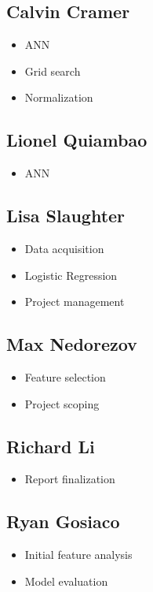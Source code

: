\documentclass[letterpaper, 12 pt, conference]{ieeeconf}  %
\begin{document}
\subsection*{Calvin Cramer}
        \begin{itemize}
                \item ANN
                \item Grid search
                \item Normalization
        \end{itemize}

\subsection*{Lionel Quiambao}
        \begin{itemize}
                \item ANN
        \end{itemize}

\subsection*{Lisa Slaughter}
        \begin{itemize}
                \item Data acquisition
                \item Logistic Regression
                \item Project management
        \end{itemize}

\subsection*{Max Nedorezov}
        \begin{itemize}
                \item Feature selection
                \item Project scoping
        \end{itemize}

\subsection*{Richard Li}
        \begin{itemize}
                \item Report finalization
        \end{itemize}

\subsection*{Ryan Gosiaco}
        \begin{itemize}
                \item Initial feature analysis
                \item Model evaluation
        \end{itemize}
\end{document}
